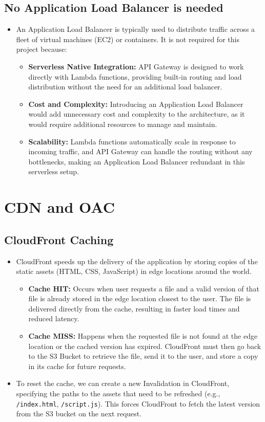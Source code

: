 \subsection{No Application Load Balancer is needed}
\begin{itemize}
  \item An Application Load Balancer is typically used to distribute traffic across a fleet of virtual machines (EC2) or containers. It is not required for this project because:
  \begin{itemize}
    \item \textbf{Serverless Native Integration:} API Gateway is designed to work directly with Lambda functions, providing built-in routing and load distribution without the need for an additional load balancer.
    \item \textbf{Cost and Complexity:} Introducing an Application Load Balancer would add unnecessary cost and complexity to the architecture, as it would require additional resources to manage and maintain.
    \item \textbf{Scalability:} Lambda functions automatically scale in response to incoming traffic, and API Gateway can handle the routing without any bottlenecks, making an Application Load Balancer redundant in this serverless setup.
  \end{itemize}
\end{itemize}

\section{CDN and OAC}

\subsection{CloudFront Caching}
\begin{itemize}
  \item CloudFront speeds up the delivery of the application by storing copies of the static assets (HTML, CSS, JavaScript) in edge locations around the world.
  \begin{itemize}
    \item \textbf{Cache HIT:} Occurs when user requests a file and a valid version of that file is already stored in the edge location closest to the user. The file is delivered directly from the cache, resulting in faster load times and reduced latency.
    \item \textbf{Cache MISS:} Happens when the requested file is not found at the edge location or the cached version has expired. CloudFront must then go back to the S3 Bucket to retrieve the file, send it to the user, and store a copy in its cache for future requests.
  \end{itemize}
  \item To reset the cache, we can create a new Invalidation in CloudFront, specifying the paths to the assets that need to be refreshed (e.g., \texttt{/index.html}, \texttt{/script.js}). This forces CloudFront to fetch the latest version from the S3 bucket on the next request.
\end{itemize}

